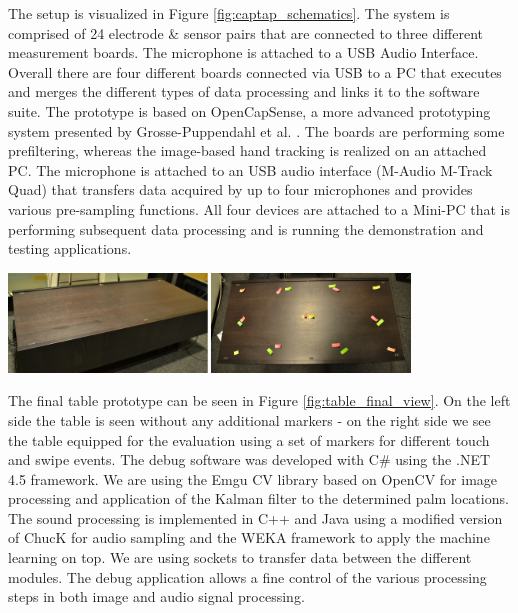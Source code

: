 The setup is visualized in Figure \ref{fig:captap_schematics}. The system is comprised of 24 electrode \& sensor pairs that are connected to three different measurement boards. The microphone is attached to a USB Audio Interface. Overall there are four different boards connected via USB to a  PC that executes and merges the different types of data processing and links it to the software suite. The prototype is based on OpenCapSense, a more advanced prototyping system presented by Grosse-Puppendahl et al. \cite{grosse2013opencapsense}. The boards are performing some prefiltering, whereas the image-based hand tracking is realized on an attached PC. The microphone is attached to an USB audio interface (M-Audio M-Track Quad) that transfers data acquired by up to four microphones and provides various pre-sampling functions. All four devices are attached to a Mini-PC that is performing subsequent data processing and is running the demonstration and testing applications. 
 
\begin{minipage}{\linewidth}
\centering
\includegraphics[width=0.8\textwidth]{images/table_final_view}
\label{fig:table_final_view}
\end{minipage}

The final table prototype can be seen in Figure \ref{fig:table_final_view}. On the left side the table is seen without any additional markers - on the right side we see the table equipped for the evaluation using a set of markers for different touch and swipe events. The debug software was developed with C\# using the .NET 4.5 framework. We are using the Emgu CV library based on OpenCV for image processing and application of the Kalman filter to the determined palm locations. The sound processing is implemented in C++ and Java using a modified version of ChucK for audio sampling and the WEKA framework to apply the machine learning on top. We are using sockets to transfer data between the different modules. The debug application allows a fine control of the various processing steps in both image and audio signal processing.


